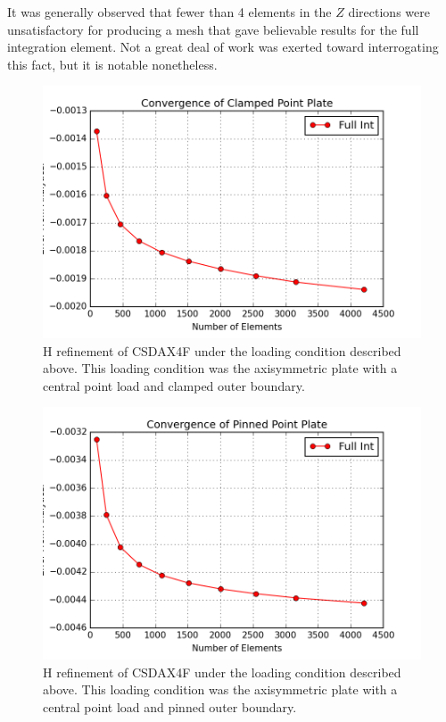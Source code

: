 \documentclass[10pt,letterpaper]{report}
\numberwithin{equation}{chapter}
\begin{document}
It was generally observed that fewer than 4 elements in the $Z$ directions were unsatisfactory for producing a mesh that gave believable results for the full integration element. Not a great deal of work was exerted toward interrogating this fact, but it is notable nonetheless.


\begin{figure}[H]
\centering
\includegraphics[width=0.7\linewidth]{./GoodImages/Conv_PlPoCl_2}
\caption[H refinement of CSDAX4F]{H refinement of CSDAX4F under the loading condition described above. This loading condition was the axisymmetric plate with a central point load and clamped outer boundary.}
\label{fig:Fig1}
\end{figure}

\begin{figure}[H]
\centering
\includegraphics[width=0.7\linewidth]{./GoodImages/Conv_PlPoPi_2}
\caption[H refinement of CSDAX4F]{H refinement of CSDAX4F under the loading condition described above. This loading condition was the axisymmetric plate with a central point load and pinned outer boundary.}
\label{fig:Fig2}
\end{figure}
\end{document}
